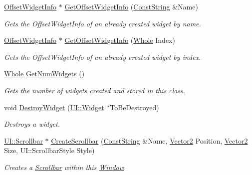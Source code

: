 \begin{DoxyCompactItemize}
\hyperlink{structphys_1_1UI_1_1ResizingInfo}{OffsetWidgetInfo} $\ast$ \hyperlink{classphys_1_1UI_1_1Window_a77a2091e41766344253cac55af650f54}{GetOffsetWidgetInfo} (\hyperlink{namespacephys_a5ce5049f8b4bf88d6413c47b504ebb31}{ConstString} \&Name)
\begin{DoxyCompactList}\small\item\em Gets the OffsetWidgetInfo of an already created widget by name. \item\end{DoxyCompactList}\item 
\hyperlink{structphys_1_1UI_1_1ResizingInfo}{OffsetWidgetInfo} $\ast$ \hyperlink{classphys_1_1UI_1_1Window_a237b11a0dde5dc46856c96c61e6bb977}{GetOffsetWidgetInfo} (\hyperlink{namespacephys_a460f6bc24c8dd347b05e0366ae34f34a}{Whole} Index)
\begin{DoxyCompactList}\small\item\em Gets the OffsetWidgetInfo of an already created widget by index. \item\end{DoxyCompactList}\item 
\hyperlink{namespacephys_a460f6bc24c8dd347b05e0366ae34f34a}{Whole} \hyperlink{classphys_1_1UI_1_1Window_a062270984d25dca44f0bc4d65ef324a0}{GetNumWidgets} ()
\begin{DoxyCompactList}\small\item\em Gets the number of widgets created and stored in this class. \item\end{DoxyCompactList}\item 
void \hyperlink{classphys_1_1UI_1_1Window_ab4bda54a82b64aec2cf4e03201a40772}{DestroyWidget} (\hyperlink{classphys_1_1UI_1_1Widget}{UI::Widget} $\ast$ToBeDestroyed)
\begin{DoxyCompactList}\small\item\em Destroys a widget. \item\end{DoxyCompactList}\item 
\hyperlink{classphys_1_1UI_1_1Scrollbar}{UI::Scrollbar} $\ast$ \hyperlink{classphys_1_1UI_1_1Window_a2e66d320eb95d4e8474558267e85bdd4}{CreateScrollbar} (\hyperlink{namespacephys_a5ce5049f8b4bf88d6413c47b504ebb31}{ConstString} \&Name, \hyperlink{classphys_1_1Vector2}{Vector2} Position, \hyperlink{classphys_1_1Vector2}{Vector2} Size, UI::ScrollbarStyle Style)
\begin{DoxyCompactList}\small\item\em Creates a \hyperlink{classphys_1_1UI_1_1Scrollbar}{Scrollbar} within this \hyperlink{classphys_1_1UI_1_1Window}{Window}. \item\end{DoxyCompactList}\item 

\end{DoxyCompactItemize}
